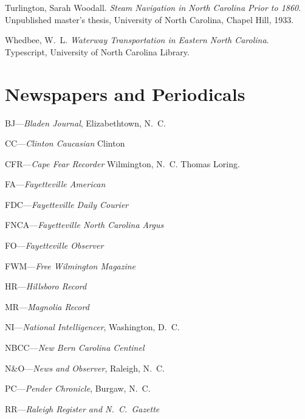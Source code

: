 \documentclass[11pt, a5paper]{book}
\begin{document}
\begin{thebibliography}{99}
  Turlington, Sarah Woodall.  \emph{Steam Navigation in North Carolina Prior
    to 1860}.  Unpublished master's thesis, University of North Carolina, Chapel
  Hill, 1933.

  Whedbee, W.~L.  \emph{Waterway Transportation in Eastern North Carolina}.
  Typescript, University of North Carolina Library.


\section*{Newspapers and Periodicals}

  BJ---\emph{Bladen Journal}, Elizabethtown, N.~C.

  CC---\emph{Clinton Caucasian} Clinton

  CFR---\emph{Cape Fear Recorder} Wilmington, N.~C.  Thomas Loring.

  FA---\emph{Fayetteville American}

  FDC---\emph{Fayetteville Daily Courier}

  FNCA---\emph{Fayetteville North Carolina Argus}

  FO---\emph{Fayetteville Observer}

  FWM---\emph{Free Wilmington Magazine}

  HR---\emph{Hillsboro Record}

  MR---\emph{Magnolia Record}

  NI---\emph{National Intelligencer}, Washington, D.~C.

  NBCC---\emph{New Bern Carolina Centinel}

  N\&O---\emph{News and Observer}, Raleigh, N.~C.

  PC---\emph{Pender Chronicle}, Burgaw, N.~C.

  RR---\emph{Raleigh Register and N.~C.~Gazette}


\end{thebibliography}
\end{document}
